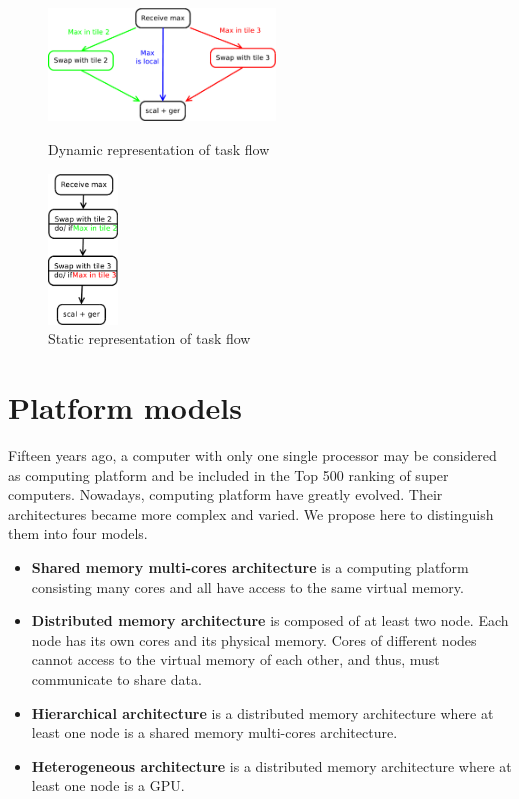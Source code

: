 \begin{figure}[!ht]
\begin{minipage}[!ht]{.5\textwidth}
\centering
\includegraphics[height=3cm]{figures/dynamic.pdf}
\caption{Dynamic representation of task flow\label{fig:dynamic}}
\end{minipage} \hfill
\begin{minipage}[!ht]{.5\textwidth}
\centering
\includegraphics[height=4cm]{figures/static.pdf}
\caption{Static representation of task flow\label{fig:static}}
\end{minipage}
\end{figure}

\section{Platform models \label{platform}}
Fifteen years ago, a computer with only one single processor may be considered as computing platform and be included in the Top 500 ranking of super computers. Nowadays, computing platform have greatly evolved. Their architectures became more complex and varied. We propose here to distinguish them into four models.
\begin{itemize}
\item \textbf{Shared memory multi-cores architecture} is a computing platform consisting many cores and all have access to the same virtual memory.
\item \textbf{Distributed memory architecture} is composed of at least two node. Each node has its own cores and its physical memory. Cores of different nodes cannot access to the virtual memory of each other, and thus, must communicate to share data.
\item \textbf{Hierarchical architecture} is a distributed memory architecture where at least one node is a shared memory multi-cores architecture.
\item \textbf{Heterogeneous architecture} is a distributed memory architecture where at least one node is a GPU.
\end{itemize}